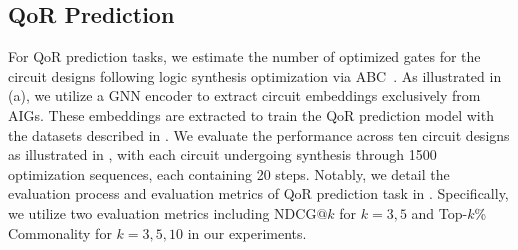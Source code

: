 \subsection{QoR Prediction}
For QoR prediction tasks, we estimate the number of optimized gates for the circuit designs following logic synthesis optimization via ABC~\citep{brayton2010abc}.
As illustrated in (a), we utilize a GNN encoder to extract circuit embeddings exclusively from AIGs.
These embeddings are extracted to train the QoR prediction model with the datasets described in . 
We evaluate the performance across ten circuit designs as illustrated in , with each circuit undergoing synthesis through 1500 optimization sequences, each containing 20 steps.
Notably, we detail the evaluation process and evaluation metrics of QoR prediction task in .
Specifically, we utilize two evaluation metrics including $\text{NDCG}@k$ for $k=3, 5$ and Top-$k$\% Commonality for $k=3, 5, 10$ in our experiments.


